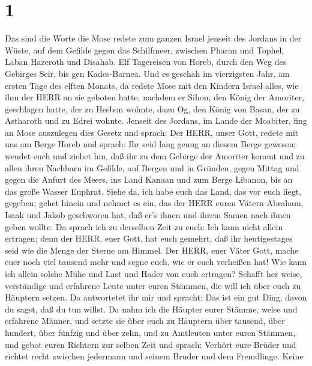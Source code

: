 \hypertarget{section}{%
\section{1}\label{section}}

 Das sind die Worte die Mose redete zum ganzen Israel
jenseit des Jordans in der Wüste, auf dem Gefilde gegen das Schilfmeer,
zwischen Pharan und Tophel, Laban Hazeroth und Disahab.  Elf
Tagereisen von Horeb, durch den Weg des Gebirges Seir, bis gen
Kades-Barnea.  Und es geschah im vierzigsten Jahr, am ersten
Tage des elften Monats, da redete Mose mit den Kindern Israel alles, wie
ihm der HERR an sie geboten hatte,  nachdem er Sihon, den
König der Amoriter, geschlagen hatte, der zu Hesbon wohnte, dazu Og, den
König von Basan, der zu Astharoth und zu Edrei wohnte. 
Jenseit des Jordans, im Lande der Moabiter, fing an Mose auszulegen dies
Gesetz und sprach:  Der HERR, unser Gott, redete mit uns am
Berge Horeb und sprach: Ihr seid lang genug an diesem Berge gewesen;
 wendet euch und ziehet hin, daß ihr zu dem Gebirge der
Amoriter kommt und zu allen ihren Nachbarn im Gefilde, auf Bergen und in
Gründen, gegen Mittag und gegen die Anfurt des Meers, ins Land Kanaan
und zum Berge Libanon, bis an das große Wasser Euphrat. 
Siehe da, ich habe euch das Land, das vor euch liegt, gegeben; gehet
hinein und nehmet es ein, das der HERR euren Vätern Abraham, Isaak und
Jakob geschworen hat, daß er's ihnen und ihrem Samen nach ihnen geben
wollte.  Da sprach ich zu derselben Zeit zu euch: Ich kann
nicht allein ertragen;  denn der HERR, euer Gott, hat euch
gemehrt, daß ihr heutigestages seid wie die Menge der Sterne am Himmel.
 Der HERR, euer Väter Gott, mache euer noch viel tausend
mehr und segne euch, wie er euch verheißen hat!  Wie kann
ich allein solche Mühe und Last und Hader von euch ertragen?
 Schafft her weise, verständige und erfahrene Leute unter
euren Stämmen, die will ich über euch zu Häuptern setzen. 
Da antwortetet ihr mir und spracht: Das ist ein gut Ding, davon du
sagst, daß du tun willst.  Da nahm ich die Häupter eurer
Stämme, weise und erfahrene Männer, und setzte sie über euch zu Häuptern
über tausend, über hundert, über fünfzig und über zehn, und zu Amtleuten
unter euren Stämmen,  und gebot euren Richtern zur selben
Zeit und sprach: Verhört eure Brüder und richtet recht zwischen
jedermann und seinem Bruder und dem Fremdlinge.  Keine
